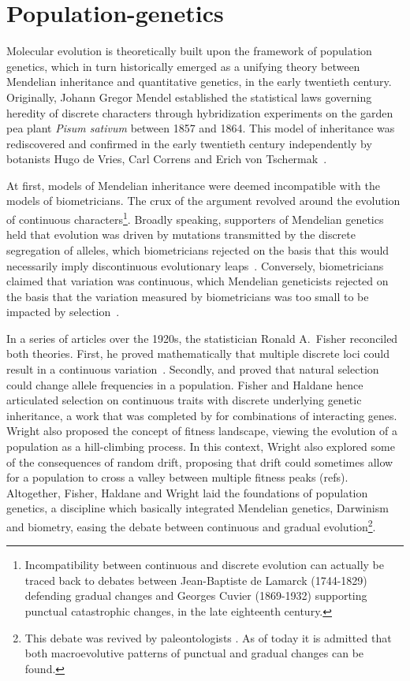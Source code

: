 \section{Population-genetics}
Molecular evolution is theoretically built upon the framework of population genetics, which in turn historically emerged as a unifying theory between Mendelian inheritance and quantitative genetics, in the early twentieth century.
Originally, Johann Gregor Mendel established the statistical laws governing heredity of discrete characters through hybridization experiments on the garden pea plant \textit{Pisum sativum} between 1857 and 1864.
This model of inheritance was rediscovered and confirmed in the early twentieth century independently by botanists Hugo de Vries, Carl Correns and Erich von Tschermak~\citep{dunn2003gregor}.

At first, models of Mendelian inheritance were deemed incompatible with the models of biometricians.
The crux of the argument revolved around the evolution of continuous characters\footnote{Incompatibility between continuous and discrete evolution can actually be traced back to debates between Jean-Baptiste de Lamarck (1744-1829) defending gradual changes and Georges Cuvier (1869-1932) supporting punctual catastrophic changes, in the late eighteenth century.}.
Broadly speaking, supporters of Mendelian genetics held that evolution was driven by mutations transmitted by the discrete segregation of {alleles}, which biometricians rejected on the basis that this would necessarily imply discontinuous evolutionary leaps~\citep{bowler2003evolution}.
Conversely, biometricians claimed that variation was continuous, which Mendelian geneticists rejected on the basis that the variation measured by biometricians was too small to be impacted by selection~\citep{provine2001origins}.

In a series of articles over the 1920s, the statistician Ronald A.\ Fisher reconciled both theories.
First, he proved mathematically that multiple discrete loci could result in a continuous variation~\citep{fisher1919xv}.
Secondly, \citet{fisher1930genetical} and \citet{haldane1932causes} proved that natural selection could change \gls{allele} frequencies in a population.
Fisher and Haldane hence articulated selection on continuous traits with discrete underlying genetic inheritance, a work that was completed by \citet{wright1932roles} for combinations of interacting genes.
Wright also proposed the concept of fitness landscape, viewing the evolution of a population as a hill-climbing process.
In this context, Wright also explored some of the consequences of random drift, proposing that drift could sometimes allow for a population to cross a valley between multiple fitness peaks (refs).
Altogether, Fisher, Haldane and Wright laid the foundations of population genetics, a discipline which basically integrated Mendelian genetics, Darwinism and biometry, easing the debate between continuous and gradual evolution\footnote{This debate was revived by paleontologists \citet*{Gould1972}.
As of today it is admitted that both macroevolutive patterns of punctual and gradual changes can be found.}.

